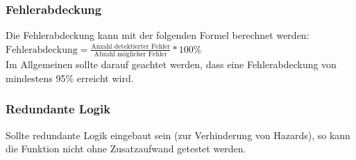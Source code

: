 \subsubsection{Fehlerabdeckung}
Die Fehlerabdeckung kann mit der folgenden Formel berechnet werden: \\
$\text{Fehlerabdeckung}=\frac{\text{Anzahl detektierter Fehler}}{\text{Abzahl möglicher Fehler}}*100\%$ \\
Im Allgemeinen sollte darauf geachtet werden, dass eine Fehlerabdeckung von mindestens 95\% erreicht wird.

\subsubsection{Redundante Logik}
Sollte redundante Logik eingebaut sein (zur Verhinderung von Hazards), so kann die Funktion nicht ohne Zusatzaufwand getestet werden.
